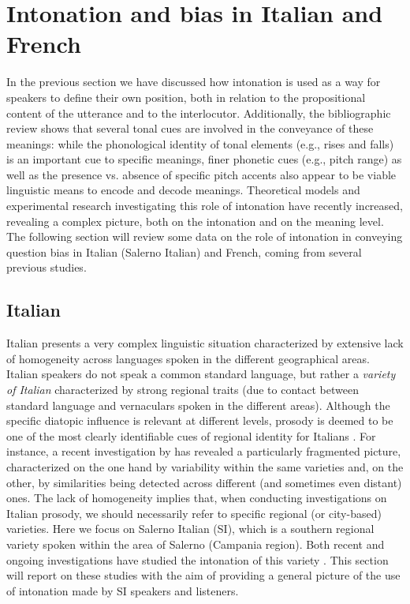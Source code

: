 \documentclass[output=paper,colorlinks,citecolor=brown]{langscibook}
\begin{document}
\section{Intonation and bias in Italian and French}\label{sec:04:3}
In the previous section we have discussed how intonation is used as a way for speakers to define their own position, both in relation to the propositional content of the utterance and to the interlocutor. Additionally, the bibliographic review shows that several tonal cues are involved in the conveyance of these meanings: while the phonological identity of tonal elements (e.g., rises and falls) is an important cue to specific meanings, finer phonetic cues (e.g., pitch range) as well as the presence vs. absence of specific pitch accents also appear to be viable linguistic means to encode and decode meanings. Theoretical models and experimental research investigating this role of intonation have recently increased, revealing a complex picture, both on the intonation and on the meaning level. The following section will review some data on the role of intonation in conveying question bias in Italian (Salerno Italian) and French, coming from several previous studies.

\subsection{Italian}\label{sec:04:3sub1}
Italian presents a very complex linguistic situation characterized by extensive lack of homogeneity across languages spoken in the different geographical areas. Italian speakers do not speak a common standard language, but rather a \textit{variety of Italian} characterized by strong regional traits (due to contact between standard language and vernaculars spoken in the different areas). Although the specific diatopic influence is relevant at different levels, prosody is deemed to be one of the most clearly identifiable cues of regional identity for Italians \citep{Lepschy77, Cerruti11}. For instance, a recent investigation by \citet{Fivelaetal15} has revealed a particularly fragmented picture, characterized on the one hand by variability within the same varieties and, on the other, by similarities being detected across different (and sometimes even distant) ones. The lack of homogeneity implies that, when conducting investigations on Italian prosody, we should necessarily refer to specific regional (or city-based) varieties. Here we focus on Salerno Italian (SI), which is a southern regional variety spoken within the area of Salerno (Campania region). Both recent and ongoing investigations have studied the intonation of this variety \citep[among others][]{Fivelaetal15, orrico19, Orrico+2020, orrico2022}. This section will report on these studies with the aim of providing a general picture of the use of intonation made by SI speakers and listeners.
\end{document}
